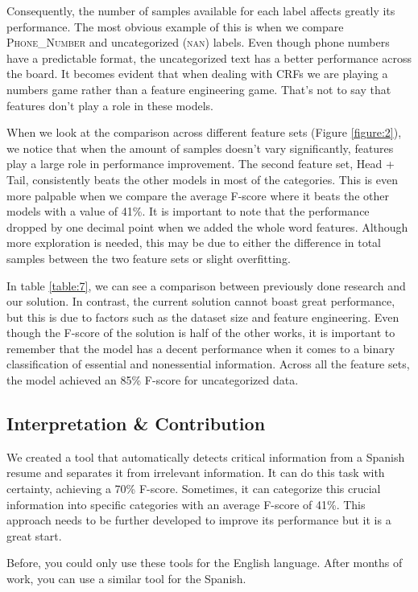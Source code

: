   Consequently, the number of samples available for each label affects greatly
  its performance. The most obvious example of this is when we compare
  \textsc{Phone\_Number} and uncategorized (\textsc{nan}) labels. Even though
  phone numbers have a predictable format, the uncategorized text has a better
  performance across the board. It becomes evident that when dealing with CRFs
  we are playing a numbers game rather than a feature engineering game. That's
  not to say that features don't play a role in these models.

  When we look at the comparison across different feature sets (Figure
  \ref{figure:2}), we notice that when the amount of samples doesn't vary
  significantly, features play a large role in performance improvement. The
  second feature set, Head + Tail, consistently beats the other models in most
  of the categories. This is even more palpable when we compare the average
  F-score where it beats the other models with a value of 41\%. It is
  important to note that the performance dropped by one decimal point when we
  added the whole word features. Although more exploration is needed, this may
  be due to either the difference in total samples between the two feature sets
  or slight overfitting.

  In table \ref{table:7}, we can see a comparison between previously done
  research and our solution. In contrast, the current solution cannot boast
  great performance, but this is due to factors such as the dataset size and
  feature engineering. Even though the F-score of the solution is half of
  the other works, it is important to remember that the model has a decent
  performance when it comes to a binary classification of essential and
  nonessential information. Across all the feature sets, the model achieved an
  85\% F-score for uncategorized data.

  \subsection{Interpretation \& Contribution}
  We created a tool that automatically detects critical information from a
  Spanish resume and separates it from irrelevant information. It can do this
  task with certainty, achieving a 70\% F-score. Sometimes, it can categorize
  this crucial information into specific categories with an average F-score of
  41\%.  This approach needs to be further developed to improve its performance
  but it is a great start.

  Before, you could only use these tools for the English language. After months
  of work, you can use a similar tool for the Spanish.


